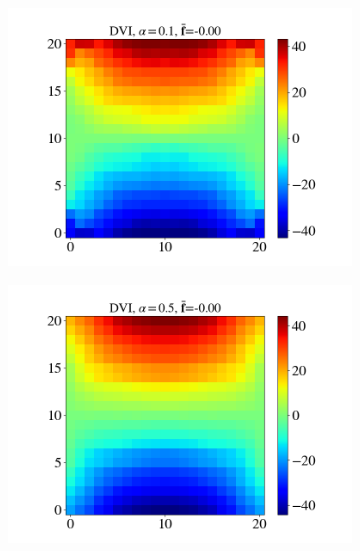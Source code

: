 \begin{itemize}
\begin{figure}[H]
\begin{subfigure}{0.32\columnwidth}
			\includegraphics[width=1.0\textwidth]{images/CD/Example7/20/T1_21_DVI_0.1.png}
		\end{subfigure}
		\begin{subfigure}{0.32\columnwidth}	
			\centering
			\includegraphics[width=1.0\textwidth]{images/CD/Example7/20/T1_21_DVI_0.5.png}
		\end{subfigure}
		\begin{subfigure}{0.32\columnwidth}	
			\centering

\end{subfigure}
\end{figure}
\end{itemize}
